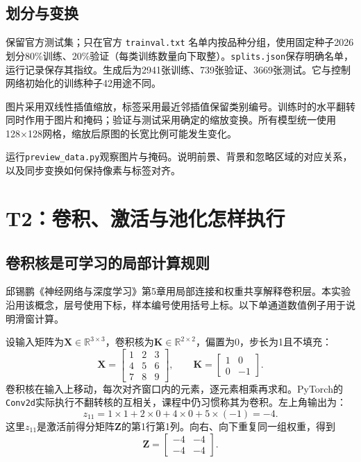 \documentclass[UTF8,a4paper,11pt,fontset=fandol]{ctexart}
\newcommand{\file}[1]{\nolinkurl{#1}}
\begin{document}
\subsection{划分与变换}
保留官方测试集；只在官方 \file{trainval.txt} 名单内按品种分组，使用固定种子2026划分80\%训练、20\%验证（每类训练数量向下取整）。\file{splits.json}保存明确名单，运行记录保存其指纹。生成后为2941张训练、739张验证、3669张测试。它与控制网络初始化的训练种子42用途不同。

图片采用双线性插值缩放，标签采用最近邻插值保留类别编号。训练时的水平翻转同时作用于图片和掩码；验证与测试采用确定的缩放变换。所有模型统一使用128×128网格，缩放后原图的长宽比例可能发生变化。
\begin{questionbox}[检查点]
运行\file{preview_data.py}观察图片与掩码。说明前景、背景和忽略区域的对应关系，以及同步变换如何保持像素与标签对齐。
\end{questionbox}
\clearpage

\section{T2：卷积、激活与池化怎样执行}
\subsection{卷积核是可学习的局部计算规则}
邱锡鹏《神经网络与深度学习》第5章用局部连接和权重共享解释卷积层。本实验沿用该概念，层号使用下标，样本编号使用括号上标。以下单通道数值例子用于说明滑窗计算。

设输入矩阵为$\mathbf X\in\mathbb R^{3\times3}$，卷积核为$\mathbf K\in\mathbb R^{2\times2}$，偏置为0，步长为1且不填充：
\begin{equation}
\mathbf X=\begin{bmatrix}1&2&3\\4&5&6\\7&8&9\end{bmatrix},\qquad
\mathbf K=\begin{bmatrix}1&0\\0&-1\end{bmatrix}.
\end{equation}
卷积核在输入上移动，每次对齐窗口内的元素，逐元素相乘再求和。PyTorch的\file{Conv2d}实际执行不翻转核的互相关，课程中仍习惯称其为卷积。左上角输出为：
\begin{equation}
z_{11}=1\times1+2\times0+4\times0+5\times(-1)=-4.
\end{equation}
这里$z_{11}$是激活前得分矩阵$\mathbf Z$的第1行第1列。向右、向下重复同一组权重，得到
\begin{equation}
\mathbf Z=\begin{bmatrix}-4&-4\\-4&-4\end{bmatrix}.
\end{equation}
\end{document}
